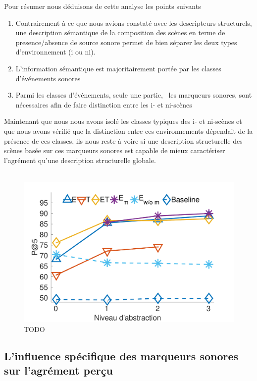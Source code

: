 Pour résumer nous déduisons de cette analyse les points suivants

\begin{enumerate}
\item Contrairement à ce que nous avions constaté avec les descripteurs structurels, une description sémantique de la composition des scènes en terme de presence/absence de source sonore permet de bien séparer les deux types d'environnement (i ou ni).
\item L'information sémantique est majoritairement portée par les classes d'événements sonores
\item Parmi les classes d'événements, seule une partie, \ie~les marqueurs sonores, sont nécessaires afin de faire distinction entre les i- et ni-scènes
\end{enumerate}

Maintenant que nous nous avons isolé les classes typiques des i- et ni-scènes et que nous avons vérifié que la distinction entre ces environnements dépendait de la présence de ces classes, ils nous reste à voire si une description structurelle  des scènes basée sur ces marqueurs sonores est capable de mieux caractériser l'agrément qu'une description structurelle globale. \\

\\

\begin{figure}[t]
        \myfloatalign
        \includegraphics[width=.9\linewidth]{gfxXpUrbanSoundscape/pa5_1}
       \caption[TODO]{TODO}\label{fig:pa5}
\end{figure}

\subsection{L'influence spécifique des marqueurs sonores sur l'agrément perçu}

